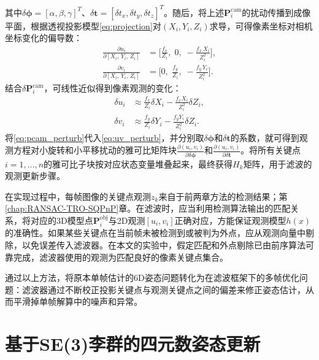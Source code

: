 其中$\delta \boldsymbol{\phi}=[\alpha,\beta,\gamma]^T$、$\delta \mathbf{t}=[\delta t_x,\delta t_y,\delta t_z]^T$。随后，将上述$\mathbf{P}_i^{\mathrm{cam}}$的扰动传播到成像平面，根据透视投影模型\eqref{eq:projection}对$(X_i,Y_i,Z_i)$求导，可得像素坐标对相机坐标变化的偏导数：
\begin{equation}
	\begin{aligned}
		\frac{\partial u_i}{\partial [X_i,\,Y_i,\,Z_i]} 
		&= \biggl[\frac{f_x}{Z_i},\;0,\;-\frac{f_x\,X_i}{Z_i^2}\biggr],\\[6pt]
		\frac{\partial v_i}{\partial [X_i,\,Y_i,\,Z_i]} 
		&= \biggl[0,\;\frac{f_y}{Z_i},\;-\frac{f_y\,Y_i}{Z_i^2}\biggr].
	\end{aligned}
\end{equation}
结合$\delta \mathbf{P}_i^{\mathrm{cam}}$，可线性近似得到像素观测的变化： \begin{equation}\label{eq:uv_perturb} \begin{aligned} \delta u_i &\approx \frac{f_x}{Z_i}\delta X_i - \frac{f_x X_i}{Z_i^2}\delta Z_i,\\ \delta v_i &\approx \frac{f_y}{Z_i}\delta Y_i - \frac{f_y Y_i}{Z_i^2}\delta Z_i. \end{aligned} \end{equation} 将\eqref{eq:pcam_perturb}代入\eqref{eq:uv_perturb}，并分别取$\delta \boldsymbol{\phi}$和$\delta \mathbf{t}$的系数，就可得到观测方程对小旋转和小平移扰动的雅可比矩阵块$\frac{\partial (u_i,v_i)}{\partial \delta \boldsymbol{\phi}}$和$\frac{\partial (u_i,v_i)}{\partial \delta \mathbf{t}}$。将所有关键点$i=1,\dots,n$的雅可比子块按对应状态变量堆叠起来，最终获得$H_k$矩阵，用于滤波的观测更新步骤。

在实现过程中，每帧图像的关键点观测$z_k$来自于前两章方法的检测结果；第\ref{chap:RANSAC-TRO-SQPnP}章。在滤波时，应当利用检测算法输出的匹配关系，将对应的3D模型点$\mathbf{P}_i^{\mathrm{obj}}$与2D观测$[u_i, v_i]$正确对应，方能保证观测模型$h(x)$的准确性。如果某些关键点在当前帧未被检测到或被判为外点，应从观测向量中剔除，以免误差传入滤波器。在本文的实验中，假定匹配和外点剔除已由前序算法可靠完成，滤波器使用的观测为匹配良好的像素关键点集合。

通过以上方法，将原本单帧估计的6D姿态问题转化为在滤波框架下的多帧优化问题：滤波器通过不断校正投影关键点与观测关键点之间的偏差来修正姿态估计，从而平滑掉单帧解算中的噪声和异常。

\section{基于SE(3)李群的四元数姿态更新}

